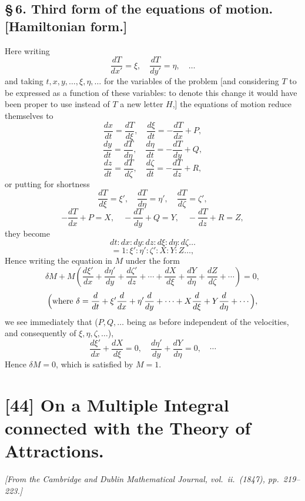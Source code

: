 \documentclass[12pt,a4paper]{article}
\begin{document}
\subsection*{\S\,6. Third form of the equations of motion. [Hamiltonian form.]}

Here writing
\[
\frac{dT}{dx'} = \xi,\quad \frac{dT}{dy'} = \eta,\quad \ldots
\]
and taking $t, x, y, \ldots, \xi, \eta, \ldots$ for the variables of the problem [and considering $T$ to be expressed as a function of these variables: to denote this change it would have been proper to use instead of $T$ a new letter $H$,] the equations of motion reduce themselves to
\[
\frac{dx}{dt} = \frac{dT}{d\xi},\quad \frac{d\xi}{dt} = -\frac{dT}{dx} + P,
\]
\[
\frac{dy}{dt} = \frac{dT}{d\eta},\quad \frac{d\eta}{dt} = -\frac{dT}{dy} + Q,
\]
\[
\frac{dz}{dt} = \frac{dT}{d\zeta},\quad \frac{d\zeta}{dt} = -\frac{dT}{dz} + R,
\]
or putting for shortness
\[
\frac{dT}{d\xi} = \xi',\quad \frac{dT}{d\eta} = \eta',\quad \frac{dT}{d\zeta} = \zeta',
\]
\[
-\frac{dT}{dx} + P = X,\quad -\frac{dT}{dy} + Q = Y,\quad -\frac{dT}{dz} + R = Z,
\]
they become
\[
dt : dx : dy : dz : d\xi : d\eta : d\zeta \ldots
\]
\[
= 1 : \xi' : \eta' : \zeta' : X : Y : Z \ldots ,
\]
Hence writing the equation in $M$ under the form
\[
\delta M + M\left(\frac{d\xi'}{dx} + \frac{d\eta'}{dy} + \frac{d\zeta'}{dz} + \cdots + \frac{dX}{d\xi} + \frac{dY}{d\eta} + \frac{dZ}{d\zeta}+\cdots\right) = 0,
\]
\[
\Bigl(\text{where } \delta = \frac{d}{dt} + \xi'\frac{d}{dx} + \eta'\frac{d}{dy} + \cdots + X\frac{d}{d\xi} + Y\frac{d}{d\eta} + \cdots\Bigr),
\]
we see immediately that ($P, Q, \ldots$ being as before independent of the velocities, and consequently of $\xi, \eta, \zeta, \ldots$),
\[
\frac{d\xi'}{dx} + \frac{dX}{d\xi} = 0,\quad \frac{d\eta'}{dy} + \frac{dY}{d\eta} = 0,\quad \cdots
\]
Hence $\delta M = 0$, which is satisfied by $M = 1$.

\newpage

\section*{[44] On a Multiple Integral connected with the Theory of Attractions.}

\textit{[From the Cambridge and Dublin Mathematical Journal, vol.~ii.~(1847), pp.~219--223.]}
\end{document}
